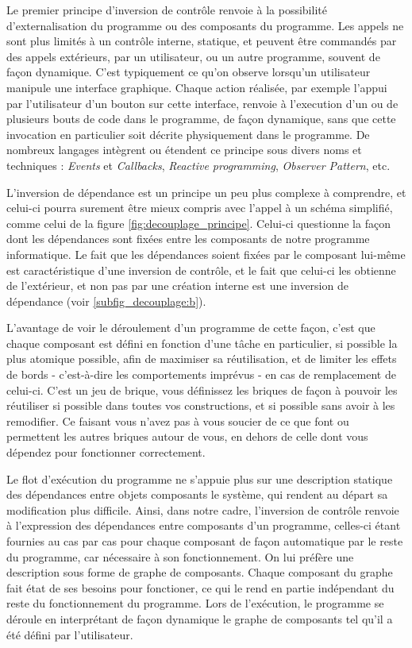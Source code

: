 Le premier principe d'inversion de contrôle renvoie à la possibilité d'externalisation du programme ou des composants du programme. Les appels ne sont plus limités à un contrôle interne, statique, et peuvent être commandés par des appels extérieurs, par un utilisateur, ou un autre programme, souvent de façon dynamique. C'est typiquement ce qu'on observe lorsqu'un utilisateur manipule une interface graphique. Chaque action réalisée, par exemple l'appui par l'utilisateur d'un bouton sur cette interface, renvoie à l'execution d'un ou de plusieurs bouts de code dans le programme, de façon dynamique, sans que cette invocation en particulier soit décrite physiquement dans le programme. De nombreux langages intègrent ou étendent ce principe sous divers noms et techniques : \textit{Events} et \textit{Callbacks}, \textit{Reactive programming}, \textit{Observer Pattern}, etc.

L'inversion de dépendance est un principe un peu plus complexe à comprendre, et celui-ci pourra surement être mieux compris avec l'appel à un schéma simplifié, comme celui de la figure \ref{fig:decouplage_principe}. Celui-ci questionne la façon dont les dépendances sont fixées entre les composants de notre programme informatique. Le fait que les dépendances soient fixées par le composant lui-même est caractéristique d'une inversion de contrôle, et le fait que celui-ci les obtienne de l'extérieur, et non pas par une création interne est une inversion de dépendance (voir \ref{subfig_decouplage:b}).

L'avantage de voir le déroulement d'un programme de cette façon, c'est que chaque composant est défini en fonction d'une tâche en particulier, si possible la plus atomique possible, afin de maximiser sa réutilisation, et de limiter les effets de bords - c'est-à-dire les comportements imprévus - en cas de remplacement de celui-ci. C'est un jeu de brique, vous définissez les briques de façon à pouvoir les réutiliser si possible dans toutes vos constructions, et si possible sans avoir à les remodifier. Ce faisant vous n'avez pas à vous soucier de ce que font ou permettent les autres briques autour de vous, en dehors de celle dont vous dépendez pour fonctionner correctement.

Le flot d'exécution du programme ne s'appuie plus sur une description statique des dépendances entre objets composants le système, qui rendent au départ sa modification plus difficile. Ainsi, dans notre cadre, l'inversion de contrôle renvoie à l'expression des dépendances entre composants d'un programme, celles-ci étant fournies au cas par cas pour chaque composant de façon automatique par le reste du programme, car nécessaire à son fonctionnement. On lui préfère une description sous forme de graphe de composants. Chaque composant du graphe fait état de ses besoins pour fonctioner, ce qui le rend en partie indépendant du reste du fonctionnement du programme. Lors de l'exécution, le programme se déroule en interprétant de façon dynamique le graphe de composants tel qu'il a été défini par l'utilisateur.

